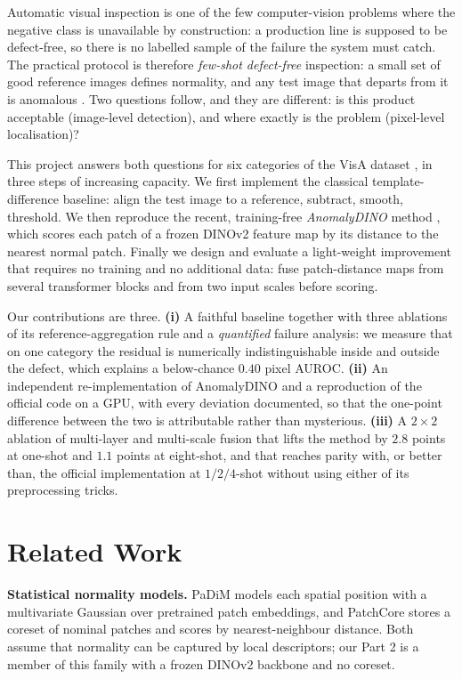 \documentclass[10pt,twocolumn,letterpaper]{article}
\begin{document}
Automatic visual inspection is one of the few computer-vision problems where
the negative class is unavailable by construction: a production line is
supposed to be defect-free, so there is no labelled sample of the failure the
system must catch. The practical protocol is therefore \emph{few-shot
defect-free} inspection: a small set of good reference images defines
normality, and any test image that departs from it is anomalous
\cite{bergmann2019mvtec}. Two questions follow, and they are different: is this
product acceptable (image-level detection), and where exactly is the problem
(pixel-level localisation)?

This project answers both questions for six categories of the VisA dataset
\cite{zou2022spot}, in three steps of increasing capacity. We first implement
the classical template-difference baseline: align the test image to a reference,
subtract, smooth, threshold. We then reproduce the recent, training-free
\emph{AnomalyDINO} method \cite{damm2025anomalydino}, which scores each patch of
a frozen DINOv2 \cite{oquab2024dinov2} feature map by its distance to the
nearest normal patch. Finally we design and evaluate a light-weight improvement
that requires no training and no additional data: fuse patch-distance maps from
several transformer blocks and from two input scales before scoring.

Our contributions are three. \textbf{(i)} A faithful baseline together with
three ablations of its reference-aggregation rule and a \emph{quantified} failure
analysis: we measure that on one category the residual is numerically
indistinguishable inside and outside the defect, which explains a below-chance
$0.40$ pixel AUROC. \textbf{(ii)} An independent re-implementation of
AnomalyDINO and a reproduction of the official code on a GPU, with every
deviation documented, so that the one-point difference between the two is
attributable rather than mysterious. \textbf{(iii)} A $2\times2$ ablation of
multi-layer and multi-scale fusion that lifts the method by $2.8$ points at
one-shot and $1.1$ points at eight-shot, and that reaches parity with, or
better than, the official implementation at $1/2/4$-shot without using either
of its preprocessing tricks.

\section{Related Work}

\textbf{Statistical normality models.} PaDiM \cite{defard2021padim} models each
spatial position with a multivariate Gaussian over pretrained patch embeddings,
and PatchCore \cite{roth2022patchcore} stores a coreset of nominal patches and
scores by nearest-neighbour distance. Both assume that normality can be captured
by local descriptors; our Part 2 is a member of this family with a frozen
DINOv2 backbone and no coreset.
\end{document}
